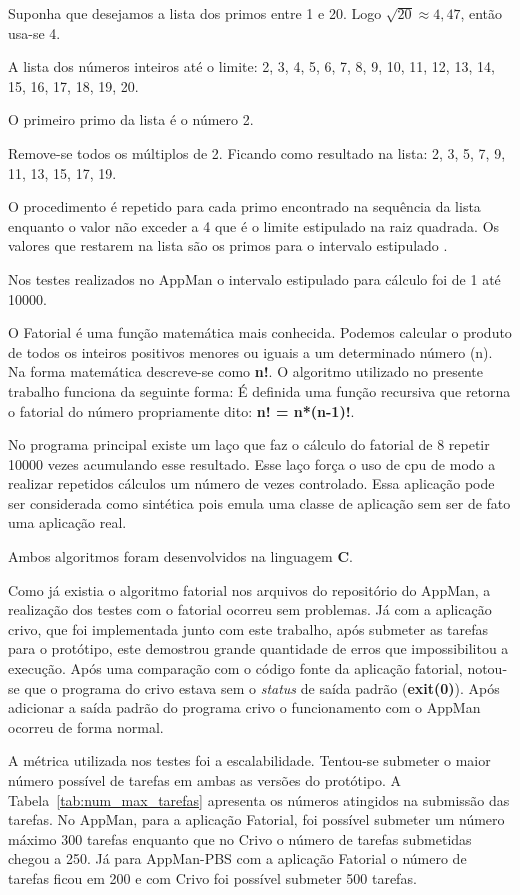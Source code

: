Suponha que desejamos a lista dos primos entre 1 e 20. Logo $\sqrt{20} \approx 4,47$, então usa-se 4. 

A lista dos números inteiros até o limite: 2, 3, 4, 5, 6, 7, 8, 9, 10, 11, 12, 13, 14, 15, 16, 17, 18, 19, 20. 

O primeiro primo da lista é o número 2. 

Remove-se todos os múltiplos de 2. Ficando como resultado na lista: 2, 3, 5, 7, 9, 11, 13, 15, 17, 19.

O procedimento é repetido para cada primo encontrado na sequência da lista enquanto o valor não exceder a 4 que é o limite estipulado na raiz quadrada. Os valores que restarem na lista são os primos para o intervalo estipulado \cite{Ewerton2008}.

Nos testes realizados no AppMan o intervalo estipulado para cálculo foi de 1 até 10000.

O Fatorial é uma função matemática mais conhecida. Podemos calcular o produto de todos os inteiros positivos menores ou iguais a um determinado número (n). Na forma matemática descreve-se como \textbf{n!}. O algoritmo utilizado no presente trabalho funciona da seguinte forma: É definida uma função recursiva que retorna o fatorial do número propriamente dito: {\bf n! = n*(n-1)!}.

No programa principal existe um laço que faz o cálculo do fatorial de 8 repetir 10000 vezes acumulando esse resultado. Esse laço força o uso de cpu de modo a realizar repetidos cálculos um número de vezes controlado. Essa aplicação pode ser considerada como sintética pois emula uma classe de aplicação sem ser de fato uma aplicação real.

Ambos algoritmos foram desenvolvidos na linguagem \textbf{C}.

Como já existia o algoritmo fatorial nos arquivos do repositório do AppMan, a realização dos testes com o fatorial ocorreu sem problemas. Já com a aplicação crivo, que foi implementada junto com este trabalho, após submeter as tarefas para o protótipo, este demostrou grande quantidade de erros que impossibilitou a execução. Após uma comparação com o código fonte da aplicação fatorial, notou-se que o programa do crivo estava sem o \emph{status} de saída padrão (\textbf{exit(0)}). Após adicionar a saída padrão do programa crivo o funcionamento com o AppMan ocorreu de forma normal.

A métrica utilizada nos testes foi a escalabilidade. Tentou-se submeter o maior número possível de tarefas em ambas as versões do protótipo. A Tabela~\ref{tab:num_max_tarefas} apresenta os números atingidos na submissão das tarefas. No AppMan, para a aplicação Fatorial, foi possível submeter um número máximo 300 tarefas enquanto que no Crivo o número de tarefas submetidas chegou a 250. Já para AppMan-PBS com a aplicação Fatorial o número de tarefas ficou em 200 e com Crivo foi possível submeter 500 tarefas.

